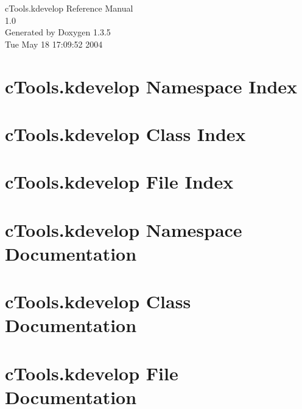 \documentclass[a4paper]{book}
\begin{document}
\begin{titlepage}
\vspace*{7cm}
\begin{center}
{\Large c\-Tools.kdevelop Reference Manual\\[1ex]\large 1.0 }\\
\vspace*{1cm}
{\large Generated by Doxygen 1.3.5}\\
\vspace*{0.5cm}
{\small Tue May 18 17:09:52 2004}\\
\end{center}
\end{titlepage}
\clearemptydoublepage
{}
\tableofcontents
\clearemptydoublepage
{}
\chapter{c\-Tools.kdevelop Namespace Index}

\chapter{c\-Tools.kdevelop Class Index}

\chapter{c\-Tools.kdevelop File Index}

\chapter{c\-Tools.kdevelop Namespace Documentation}


\chapter{c\-Tools.kdevelop Class Documentation}



\chapter{c\-Tools.kdevelop File Documentation}






\printindex
\end{document}
